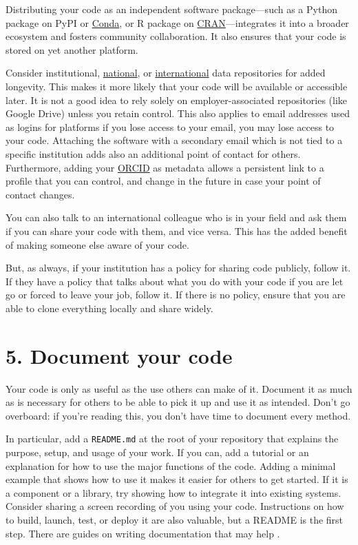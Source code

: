\documentclass[10pt,letterpaper]{article}
\begin{document}
Distributing your code as an independent software package---such as a Python package on PyPI
or \href{https://anaconda.org/anaconda/conda}{Conda},
or R package on \href{https://cran.r-project.org/}{CRAN}---integrates it into
a broader ecosystem and fosters community collaboration.
It also ensures that your code is stored on yet another platform.

Consider institutional,
\href{https://amt.coretrustseal.org/certificates/}{national},
or \href{https://safeguar.de/}{international} data repositories for added longevity.
This makes it more likely that your code will be available or accessible later.
It is not a good idea to rely solely on employer-associated repositories (like Google Drive)
unless you retain control.
This also applies to email addresses used as logins for platforms
if you lose access to your email,
you may lose access to your code.
Attaching the software with a secondary email which is not tied to a specific institution
adds also an additional point of contact for others.
Furthermore,
adding your \href{https://orcid.org/}{ORCID} as metadata
allows a persistent link to a profile that you can control,
and change in the future in case your point of contact changes.

You can also talk to an international colleague who is in your field
and ask them if you can share your code with them, and vice versa.
This has the added benefit of making someone else aware of your code.

But,
as always,
if your institution has a policy for sharing code publicly,
follow it.
If they have a policy that talks about what you do with your code if you are let go or forced to leave your job,
follow it.
If there is no policy,
ensure that you are able to clone everything locally and share widely.

\section*{5. Document your code}

Your code is only as useful as the use others can make of it.
Document it as much as is necessary for others to be able to pick it up and use it as intended.
Don't go overboard:
if you're reading this,
you don't have time to document every method.

In particular,
add a \texttt{README.md} at the root of your repository
that explains the purpose, setup, and usage of your work.
If you can,
add a tutorial or an explanation for how to use the major functions of the code.
Adding a minimal example that shows how to use it makes it easier for others to get started.
If it is a component or a library,
try showing how to integrate it into existing systems.
Consider sharing a screen recording of you using your code.
Instructions on how to build,
launch, test, or deploy it are also valuable,
but a README is the first step.
There are guides on writing documentation that may help
\cite{Huybrechts2024,Littauer2025,Katz2025,Turing2025}.
\end{document}
